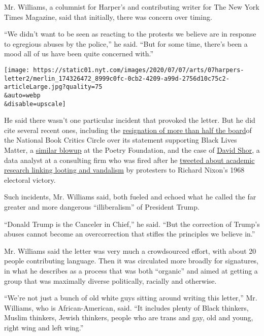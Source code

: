 Mr. Williams, a columnist for Harper's and contributing writer for The
New York Times Magazine, said that initially, there was concern over
timing.

``We didn't want to be seen as reacting to the protests we believe are
in response to egregious abuses by the police,'' he said. ``But for some
time, there's been a mood all of us have been quite concerned with.''

\texttt{[image: https://static01.nyt.com/images/2020/07/07/arts/07harpers-letter2/merlin\_174326472\_8999c0fc-0cb2-4209-a99d-2756d10c75c2-articleLarge.jpg?quality=75\\\&auto=webp\\\&disable=upscale]}

He said there wasn't one particular incident that provoked the letter.
But he did cite several recent ones, including the
\href{https://www.vulture.com/2020/06/national-book-critics-circle-resignations.html}{resignation
of more than half the board}of the National Book Critics Circle over its
statement supporting Black Lives Matter, a
\href{https://www.nytimes.com/2020/06/09/books/poetry-foundation-black-lives-matter.html}{similar
blowup} at the Poetry Foundation, and the case of
\href{https://nymag.com/intelligencer/2020/06/case-for-liberalism-tom-cotton-new-york-times-james-bennet.html}{David
Shor}, a data analyst at a consulting firm who was fired after he
\href{https://csdp.princeton.edu/news/wasow-research-widely-covered-media-how-1960s-black-protests-moved-elites-public-opinion-and}{tweeted
about academic research linking looting and vandalism} by protesters to
Richard Nixon's 1968 electoral victory.

Such incidents, Mr. Williams said, both fueled and echoed what he called
the far greater and more dangerous ``illiberalism'' of President Trump.

``Donald Trump is the Canceler in Chief,'' he said. ``But the correction
of Trump's abuses cannot become an overcorrection that stifles the
principles we believe in.''

Mr. Williams said the letter was very much a crowdsourced effort, with
about 20 people contributing language. Then it was circulated more
broadly for signatures, in what he describes as a process that was both
``organic'' and aimed at getting a group that was maximally diverse
politically, racially and otherwise.

``We're not just a bunch of old white guys sitting around writing this
letter,'' Mr. Williams, who is African-American, said. ``It includes
plenty of Black thinkers, Muslim thinkers, Jewish thinkers, people who
are trans and gay, old and young, right wing and left wing.''

